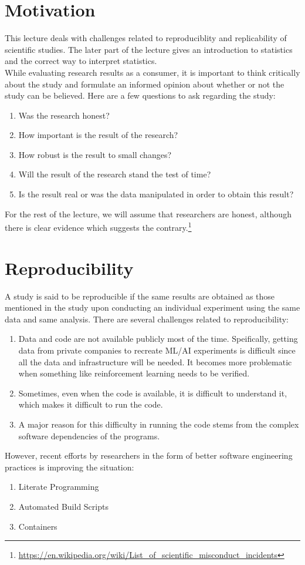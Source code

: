 
\section{Motivation}
This lecture deals with challenges related to reproduciblity and replicability of scientific studies. The later part of the lecture gives an introduction to statistics and the correct way to interpret statistics.\\
While evaluating research results as a consumer, it is important to think critically about the study and formulate an informed opinion about whether or not the study can be believed. Here are a few questions to ask regarding the study:
\begin{enumerate}
    \item Was the research honest?
    \item How important is the result of the research?
    \item How robust is the result to small changes?
    \item Will the result of the research stand the test of time?
    \item Is the result real or was the data manipulated in order to obtain this result?
\end{enumerate}
For the rest of the lecture, we will assume that researchers are honest, although there is clear evidence which suggests the contrary.\footnote{\url{https://en.wikipedia.org/wiki/List_of_scientific_misconduct_incidents}}
\section{Reproducibility}
A study is said to be reproducible if the same results are obtained as those mentioned in the study upon conducting an individual experiment using the same data and same analysis. There are several challenges related to reproducibility:
\begin{enumerate}
    \item Data and code are not available publicly most of the time. Speifically, getting data from private companies to recreate ML/AI experiments is difficult since all the data and infrastructure will be needed. It becomes more problematic when something like reinforcement learning needs to be verified.
    \item Sometimes, even when the code is available, it is difficult to understand it, which makes it difficult to run the code.
    \item A major reason for this difficulty in running the code stems from the complex software dependencies of the programs.
\end{enumerate}
However, recent efforts by researchers in the form of better software engineering practices is improving the situation:
\begin{enumerate}
    \item Literate Programming
    \item Automated Build Scripts
    \item Containers
\end{enumerate}
